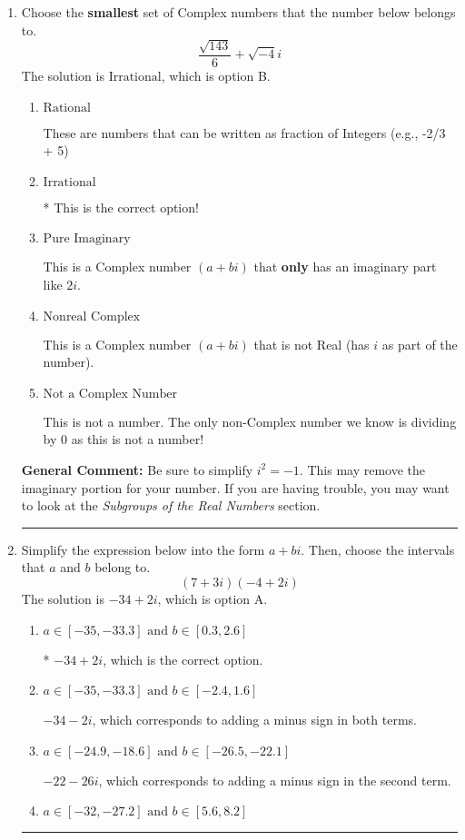 \documentclass{extbook}[14pt]
\newcommand{\litem}[1]{\item #1

\rule{\textwidth}{0.4pt}}
\begin{document}
\begin{enumerate}
{ Irrational numbers are more than just square root of 3: adding or subtracting values from square root of 3 is also irrational.
}
\litem{
Choose the \textbf{smallest} set of Complex numbers that the number below belongs to.
\[ \frac{\sqrt{143}}{6}+\sqrt{-4}i \]The solution is \( \text{Irrational} \), which is option B.\begin{enumerate}[label=\Alph*.]
\item \( \text{Rational} \)

These are numbers that can be written as fraction of Integers (e.g., -2/3 + 5)
\item \( \text{Irrational} \)

* This is the correct option!
\item \( \text{Pure Imaginary} \)

This is a Complex number $(a+bi)$ that \textbf{only} has an imaginary part like $2i$.
\item \( \text{Nonreal Complex} \)

This is a Complex number $(a+bi)$ that is not Real (has $i$ as part of the number).
\item \( \text{Not a Complex Number} \)

This is not a number. The only non-Complex number we know is dividing by 0 as this is not a number!
\end{enumerate}

\textbf{General Comment:} Be sure to simplify $i^2 = -1$. This may remove the imaginary portion for your number. If you are having trouble, you may want to look at the \textit{Subgroups of the Real Numbers} section.
}
\litem{
Simplify the expression below into the form $a+bi$. Then, choose the intervals that $a$ and $b$ belong to.
\[ (7 + 3 i)(-4 + 2 i) \]The solution is \( -34 + 2 i \), which is option A.\begin{enumerate}[label=\Alph*.]
\item \( a \in [-35, -33.3] \text{ and } b \in [0.3, 2.6] \)

* $-34 + 2 i$, which is the correct option.
\item \( a \in [-35, -33.3] \text{ and } b \in [-2.4, 1.6] \)

 $-34 - 2 i$, which corresponds to adding a minus sign in both terms.
\item \( a \in [-24.9, -18.6] \text{ and } b \in [-26.5, -22.1] \)

 $-22 - 26 i$, which corresponds to adding a minus sign in the second term.
\item \( a \in [-32, -27.2] \text{ and } b \in [5.6, 8.2] \)


\end{enumerate}}
\end{enumerate}
\end{document}
